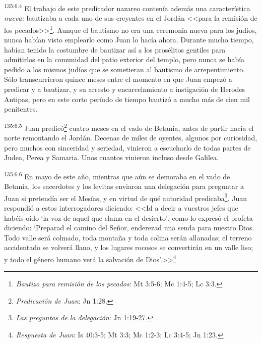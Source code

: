 \par 
\textsuperscript{135:6.4} El trabajo de este predicador nazareo contenía además una característica \textit{nueva:} bautizaba a cada uno de sus creyentes en el Jordán <<para la remisión de los pecados>>\footnote{\textit{Bautizo para remisión de los pecados}: Mt 3:5-6; Mc 1:4-5; Lc 3:3.}. Aunque el bautismo no era una ceremonia nueva para los judíos, nunca habían visto emplearlo como Juan lo hacía ahora. Durante mucho tiempo, habían tenido la costumbre de bautizar así a los prosélitos gentiles para admitirlos en la comunidad del patio exterior del templo, pero nunca se había pedido a los mismos judíos que se sometieran al bautismo de arrepentimiento. Sólo transcurrieron quince meses entre el momento en que Juan empezó a predicar y a bautizar, y su arresto y encarcelamiento a instigación de Herodes Antipas, pero en este corto período de tiempo bautizó a mucho más de cien mil penitentes.

\par 
\textsuperscript{135:6.5} Juan predicó\footnote{\textit{Predicación de Juan}: Jn 1:28.} cuatro meses en el vado de Betania, antes de partir hacia el norte remontando el Jordán. Decenas de miles de oyentes, algunos por curiosidad, pero muchos con sinceridad y seriedad, vinieron a escucharlo de todas partes de Judea, Perea y Samaria. Unos cuantos vinieron incluso desde Galilea.

\par 
\textsuperscript{135:6.6} En mayo de este año, mientras que aún se demoraba en el vado de Betania, los sacerdotes y los levitas enviaron una delegación para preguntar a Juan si pretendía ser el Mesías, y en virtud de qué autoridad predicaba\footnote{\textit{Las preguntas de la delegación}: Jn 1:19-27.}. Juan respondió a estos interrogadores diciendo: <<Id a decir a vuestros jefes que habéis oído `la voz de aquel que clama en el desierto', como lo expresó el profeta diciendo: `Preparad el camino del Señor, enderezad una senda para nuestro Dios. Todo valle será colmado, toda montaña y toda colina serán allanadas; el terreno accidentado se volverá llano, y los lugares rocosos se convertirán en un valle liso; y todo el género humano verá la salvación de Dios'.>>\footnote{\textit{Respuesta de Juan}: Is 40:3-5; Mt 3:3; Mc 1:2-3; Lc 3:4-5; Jn 1:23.}

